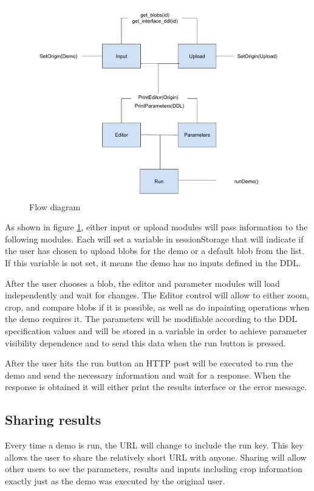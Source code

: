 \begin{figure}[h]
	\centering
	\includegraphics[width=\textwidth]{images/flow}
	\caption{Flow diagram} 
	\label{fig:flow_diagram}
\end{figure} 


As shown in figure  \ref{fig:flow_diagram}, either input or upload modules will pass 
information to the following modules. Each will set a variable in sessionStorage that will indicate if the user has chosen to 
upload blobs for the demo or a default blob from the list. If this variable is not set, it means the demo has no inputs defined 
in the DDL.

After the user chooses a blob, the editor and parameter modules will load independently and wait for changes. The Editor control 
will allow to either zoom, crop, and compare blobs if it is possible, as well as do inpainting operations when the demo requires it. 
The parameters will be modifiable according to the DDL specification values and will be stored in a variable in order to achieve 
parameter visibility dependence and to send this data when the run button is pressed.

After the user hits the run button an HTTP post will be executed to run the demo and send the necessary information and wait for 
a response. When the response is obtained it will either print the results interface or the error message.


\subsection{Sharing results}
Every time a demo is run, the URL will change to include the run key. This key allows the user to share the relatively short URL 
with anyone. Sharing will allow other users to see the parameters, results and inputs including crop information exactly just as the 
demo was executed by the original user. 


